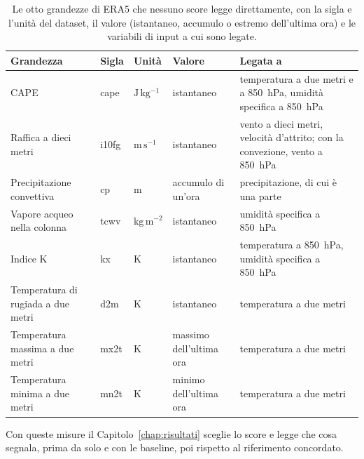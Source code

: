 \begin{table}[!htb]
    \centering
    \footnotesize
    \caption{Le otto grandezze di ERA5 che nessuno score legge direttamente, con la sigla e l'unità del dataset, il valore (istantaneo, accumulo o estremo dell'ultima ora) e le variabili di input a cui sono legate.}
    \label{tab:exp-giudici}
    \vspace{0.6em}
    \begin{tabular}{@{}L{0.26}L{0.07}L{0.11}L{0.16}L{0.27}@{}}
        \toprule
        Grandezza & Sigla & Unità & Valore & Legata a \\
        \midrule
        CAPE & cape & $\mathrm{J\,kg^{-1}}$ & istantaneo & temperatura a due metri e a 850~hPa, umidità specifica a 850~hPa \\
        Raffica a dieci metri & i10fg & $\mathrm{m\,s^{-1}}$ & istantaneo & vento a dieci metri, velocità d'attrito; con la convezione, vento a 850~hPa \\
        Precipitazione convettiva & cp & m & accumulo di un'ora & precipitazione, di cui è una parte \\
        Vapore acqueo nella colonna & tcwv & $\mathrm{kg\,m^{-2}}$ & istantaneo & umidità specifica a 850~hPa \\
        Indice K & kx & K & istantaneo & temperatura a 850~hPa, umidità specifica a 850~hPa \\
        Temperatura di rugiada a due metri & d2m & K & istantaneo & temperatura a due metri \\
        Temperatura massima a due metri & mx2t & K & massimo dell'ultima ora & temperatura a due metri \\
        Temperatura minima a due metri & mn2t & K & minimo dell'ultima ora & temperatura a due metri \\
        \bottomrule
    \end{tabular}
\end{table}

Con queste misure il Capitolo~\ref{chap:risultati} sceglie lo score e legge che cosa segnala, prima da solo e con le baseline, poi rispetto al riferimento concordato.
